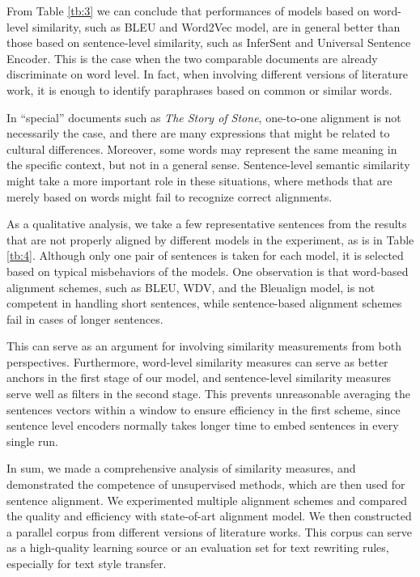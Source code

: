 \documentclass[runningheads]{llncs}
\begin{document}
From Table \ref{tb:3} we can conclude that performances of models based on word-level similarity, such as BLEU and Word2Vec model, are in general better than those based on sentence-level similarity, such as InferSent and Universal Sentence Encoder. This is the case when the two comparable documents are already discriminate on word level. In fact, when involving different versions of literature work, it is enough to identify paraphrases based on common or similar words.

In ``special'' documents such as \emph{The Story of Stone}, one-to-one alignment is not necessarily the case, and there are many expressions that might be related to cultural differences. Moreover, some words may represent the same meaning in the specific context, but not in a general sense. Sentence-level semantic similarity might take a more important role in these situations, where methods that are merely based on words might fail to recognize correct alignments.

As a qualitative analysis, we take a few representative sentences from the results that are not properly aligned by different models in the experiment, as is in Table \ref{tb:4}. Although only one pair of sentences is taken for each model, it is selected based on typical misbehaviors of the models. One observation is that word-based alignment schemes, such as BLEU, WDV, and the Bleualign model, is not competent in handling short sentences, while sentence-based alignment schemes fail in cases of longer sentences.

This can serve as an argument for involving similarity measurements from both perspectives. Furthermore, word-level similarity measures can serve as better anchors in the first stage of our model, and sentence-level similarity measures serve well as filters in the second stage. This prevents unreasonable averaging the sentences vectors within a window to ensure efficiency in the first scheme, since sentence level encoders normally takes longer time to embed sentences in every single run.

In sum, we made a comprehensive analysis of similarity measures, and demonstrated the competence of unsupervised methods, which are then used for sentence alignment. We experimented multiple alignment schemes and compared the quality and efficiency with state-of-art alignment model. We then constructed a parallel corpus from different versions of literature works. This corpus can serve as a high-quality learning source or an evaluation set for text rewriting rules, especially for text style transfer.







%
%
%
% 
%
\end{document}
